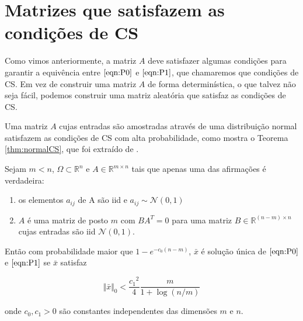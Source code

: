 \section{Matrizes que satisfazem as condições de CS}

Como vimos anteriormente, a matriz $A$ deve satisfazer algumas condições para garantir a equivência entre $\eqref{eqn:P0}$ e $\eqref{eqn:P1}$, que chamaremos que condições de CS. Em vez de construir uma matriz $A$ de forma determinística, o que talvez não seja fácil, podemos construir uma matriz aleatória que satisfaz as condições de CS.



Uma matriz $A$ cujas entradas são amostradas através de uma distribuição normal satisfazem as condições de CS com alta probabilidade, como mostra o Teorema \ref{thm:normalCS}, que foi extraído de \cite{zhang2008theory}.

\begin{teorema} \cite{zhang2008theory} Sejam $m < n$, $\Omega \subset \mathbb{R}^n$ e $A \in \mathbb{R}^{m \times n}$ tais que apenas uma das afirmações é verdadeira:
\begin{enumerate}
\item os elementos $a_{ij}$ de A são iid e $a_{ij} \sim \mathcal{N}(0,1)$
\item $A$ é uma matriz de posto $m$ com $BA^{T} = 0$ para uma matriz $B \in \mathbb{R}^{(n - m) \times n}$ cujas entradas são iid $\mathcal{N}(0,1)$.
\end{enumerate}
Então com probabilidade maior que $1 - e^{-c_0(n-m)}$, $\bar{x}$ é solução única de $\eqref{eqn:P0}$ e $\eqref{eqn:P1}$ se $\bar{x}$ satisfaz

$$ \Vert \bar{x} \Vert_0 < \frac{{c_1}^2}{4} \frac{m}{1 + \log(n/m)}$$

onde $c_0, c_1 > 0$ são constantes independentes das dimensões $m$ e $n$.
\label{thm:normalCS}
\end{teorema}
